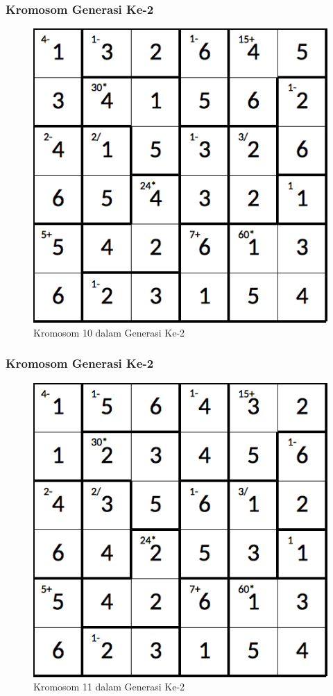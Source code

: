 \documentclass{beamer}
\begin{document}
\begin{frame}
\frametitle{Kromosom Generasi Ke-2}
\begin{figure}
\centering
\captionsetup{justification=centering}
\includegraphics[scale=0.333]{Gambar/hybridgenetic/Generation2Chromosome10}
\caption[Kromosom 10 dalam Generasi Ke-2]{Kromosom 10 dalam Generasi Ke-2}
\label{fig:analisisg2k10}
\end{figure}
\end{frame}

\note{

}

\begin{frame}
\frametitle{Kromosom Generasi Ke-2}
\begin{figure}
\centering
\captionsetup{justification=centering}
\includegraphics[scale=0.333]{Gambar/hybridgenetic/Generation2Chromosome11}
\caption[Kromosom 11 dalam Generasi Ke-2]{Kromosom 11 dalam Generasi Ke-2}
\label{fig:analisisg2k11}
\end{figure}
\end{frame}
\end{document}
